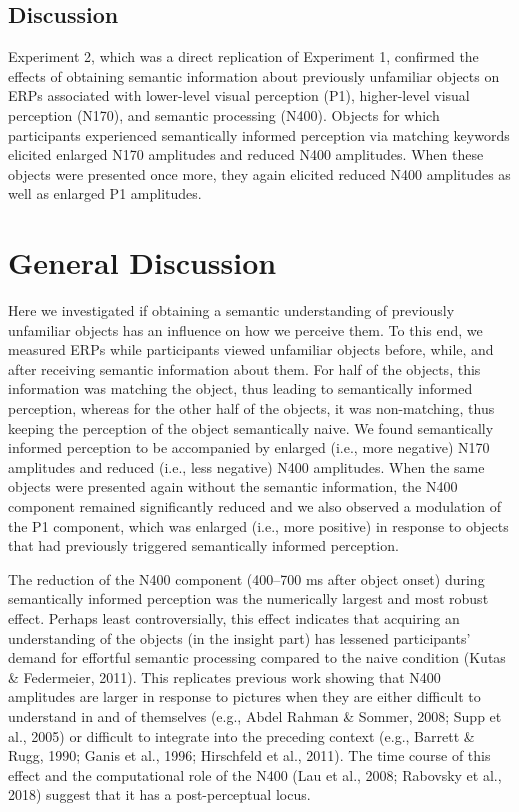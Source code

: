 \documentclass[
  english,
  doc,12pt,twoside,floatsintext]{apa7}
\begin{document}
\hypertarget{discussion-1}{%
\subsection{Discussion}\label{discussion-1}}

Experiment 2, which was a direct replication of Experiment 1, confirmed the effects of obtaining semantic information about previously unfamiliar objects on ERPs associated with lower-level visual perception (P1), higher-level visual perception (N170), and semantic processing (N400). Objects for which participants experienced semantically informed perception via matching keywords elicited enlarged N170 amplitudes and reduced N400 amplitudes. When these objects were presented once more, they again elicited reduced N400 amplitudes as well as enlarged P1 amplitudes.

\hypertarget{general-discussion}{%
\section{General Discussion}\label{general-discussion}}

Here we investigated if obtaining a semantic understanding of previously unfamiliar objects has an influence on how we perceive them. To this end, we measured ERPs while participants viewed unfamiliar objects before, while, and after receiving semantic information about them. For half of the objects, this information was matching the object, thus leading to semantically informed perception, whereas for the other half of the objects, it was non-matching, thus keeping the perception of the object semantically naive. We found semantically informed perception to be accompanied by enlarged (i.e., more negative) N170 amplitudes and reduced (i.e., less negative) N400 amplitudes. When the same objects were presented again without the semantic information, the N400 component remained significantly reduced and we also observed a modulation of the P1 component, which was enlarged (i.e., more positive) in response to objects that had previously triggered semantically informed perception.

The reduction of the N400 component (400--700 ms after object onset) during semantically informed perception was the numerically largest and most robust effect. Perhaps least controversially, this effect indicates that acquiring an understanding of the objects (in the insight part) has lessened participants' demand for effortful semantic processing compared to the naive condition (Kutas \& Federmeier, 2011). This replicates previous work showing that N400 amplitudes are larger in response to pictures when they are either difficult to understand in and of themselves (e.g., Abdel Rahman \& Sommer, 2008; Supp et al., 2005) or difficult to integrate into the preceding context (e.g., Barrett \& Rugg, 1990; Ganis et al., 1996; Hirschfeld et al., 2011). The time course of this effect and the computational role of the N400 (Lau et al., 2008; Rabovsky et al., 2018) suggest that it has a post-perceptual locus.
\end{document}
